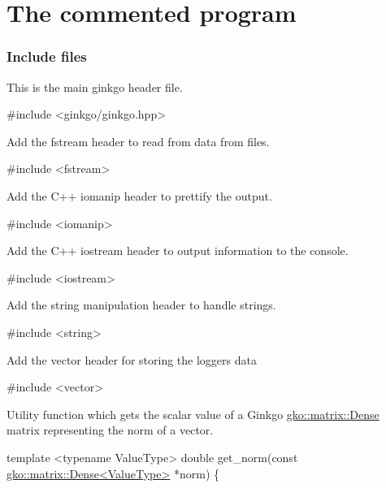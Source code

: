  \section*{The commented program}

\label{_Includefiles}%
 \subsubsection*{Include files}

This is the main ginkgo header file.


\begin{DoxyCode}
\textcolor{preprocessor}{#include <ginkgo/ginkgo.hpp>}
\end{DoxyCode}


Add the fstream header to read from data from files.


\begin{DoxyCode}
\textcolor{preprocessor}{#include <fstream>}
\end{DoxyCode}


Add the C++ iomanip header to prettify the output.


\begin{DoxyCode}
\textcolor{preprocessor}{#include <iomanip>}
\end{DoxyCode}


Add the C++ iostream header to output information to the console.


\begin{DoxyCode}
\textcolor{preprocessor}{#include <iostream>}
\end{DoxyCode}


Add the string manipulation header to handle strings.


\begin{DoxyCode}
\textcolor{preprocessor}{#include <string>}
\end{DoxyCode}


Add the vector header for storing the logger\textquotesingle{}s data


\begin{DoxyCode}
\textcolor{preprocessor}{#include <vector>}
\end{DoxyCode}


Utility function which gets the scalar value of a Ginkgo \hyperlink{classgko_1_1matrix_1_1Dense}{gko\+::matrix\+::\+Dense} matrix representing the norm of a vector.


\begin{DoxyCode}
\textcolor{keyword}{template} <\textcolor{keyword}{typename} ValueType>
\textcolor{keywordtype}{double} get\_norm(\textcolor{keyword}{const} \hyperlink{classgko_1_1matrix_1_1Dense}{gko::matrix::Dense<ValueType>} *norm)
\{
\end{DoxyCode}


